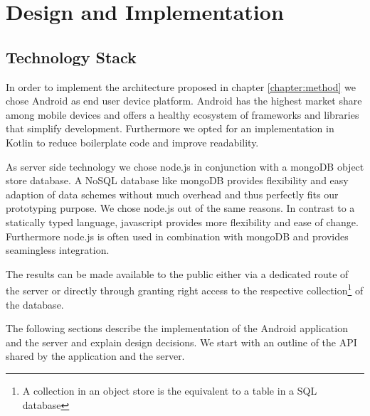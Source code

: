 \chapter{Design and Implementation}\label{chapter:design}

\section{Technology Stack}
In order to implement the architecture proposed in chapter \ref{chapter:method} we chose Android as end user device platform. Android has the highest market share \cite{android-market-share} among mobile devices and offers a healthy ecosystem of frameworks and libraries that simplify development. Furthermore we opted for an implementation in Kotlin to reduce boilerplate code and improve readability.

As server side technology we chose node.js in conjunction with a mongoDB object store database. A NoSQL database like mongoDB provides flexibility and easy adaption of data schemes without much overhead and thus perfectly fits our prototyping purpose. We chose node.js out of the same reasons. In contrast to a statically typed language, javascript provides more flexibility and ease of change. Furthermore node.js is often used in combination with mongoDB and provides seamingless integration.

The results can be made available to the public either via a dedicated route of the server or directly through granting right access to the respective collection\footnote{A collection in an object store is the equivalent to a table in a SQL database} of the database.

The following sections describe the implementation of the Android application and the server and explain design decisions. We start with an outline of the API shared by the application and the server.


